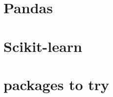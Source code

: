 \documentclass[11pt]{article}
\begin{document}
\section{Pandas}


\section{Scikit-learn}

\begin{description}
  \setlength\itemsep{1pt}
  \item[Cross Validation:] 
\end{description}


\section{packages to try}

\begin{description}
  \setlength\itemsep{1pt}
  \item[text from PDFs:] 
\end{description}



\end{document}
